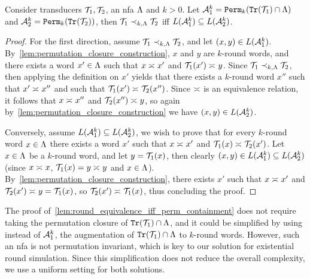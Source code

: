 \begin{lemma}
\label{lem:round_equivalence_iff_perm_containment}
	Consider transducers $\mathcal{T}_1,\mathcal{T}_2$, an \gls{nfa} $\Lambda$ and $k>0$. Let $\mathcal{A}_1^k={\mathtt{Perm}}_k({\mathtt{Tr}}(\mathcal{T}_1)\cap\Lambda)$ and $\mathcal{A}_2^k={\mathtt{Perm}}_k({\mathtt{Tr}}(\mathcal{T}_2))$,
	then $\mathcal{T}_1\prec_{k,\Lambda} \mathcal{T}_2$ iff $L(\mathcal{A}^k_1)\subseteq L(\mathcal{A}^k_2)$.
\end{lemma}
\begin{proof}
	For the first direction, assume $\mathcal{T}_1\prec_{k,\Lambda} \mathcal{T}_2$, and let $(x,y)\in L(\mathcal{A}^k_1)$. By~\cref{lem:permutation_closure_construction}, $x$ and $y$ are $k$-round words, and there exists a word $x'\in \Lambda$ such that $x\asymp_{} x'$ and $\mathcal{T}_1(x')\asymp_{} y$. Since $\mathcal{T}_1\prec_{k,\Lambda} \mathcal{T}_2$, then applying the definition on $x'$ yields that there exists a $k$-round word $x''$ such that $x'\asymp_{} x''$ and such that $\mathcal{T}_1(x')\asymp_{} \mathcal{T}_2(x'')$. Since $\asymp_{}$ is an equivalence relation, it follows that $x\asymp_{} x''$ and $\mathcal{T}_2(x'')\asymp_{} y$, so again by~\cref{lem:permutation_closure_construction} we have $(x,y)\in L(\mathcal{A}^k_2)$.
	
	Conversely, assume $L(\mathcal{A}^k_1)\subseteq L(\mathcal{A}^k_2)$, we wish to prove that for every $k$-round word $x\in \Lambda$ there exists a word $x'$ such that $x\asymp_{} x'$ and $\mathcal{T}_1(x)\asymp_{} \mathcal{T}_2(x')$. Let $x\in \Lambda$ be a $k$-round word, and let $y=\mathcal{T}_1(x)$, then clearly $(x,y)\in L(\mathcal{A}^k_1)\subseteq L(\mathcal{A}^k_2)$ (since $x\asymp_{} x$, $\mathcal{T}_1(x)=y\asymp_{} y$ and $x\in \Lambda$). By~\cref{lem:permutation_closure_construction}, there exists $x'$ such that $x\asymp_{} x'$ and $\mathcal{T}_2(x')\asymp_{} y=\mathcal{T}_1(x)$, so $\mathcal{T}_2(x')\asymp_{} \mathcal{T}_1(x)$, thus concluding the proof.
\end{proof}

\begin{remark}
\label{rmk:det_A1}
The proof of~\cref{lem:round_equivalence_iff_perm_containment} does not require taking the permutation closure of ${\mathtt{Tr}}(\mathcal{T}_1)\cap \Lambda$, and it could be simplified by using instead of $\mathcal{A}^k_1$, the augmentation of ${\mathtt{Tr}}(\mathcal{T}_1)\cap \Lambda$ to $k$-round words. However, such an \gls{nfa} is not permutation invariant, which is key to our solution for existential round simulation. Since this simplification does not reduce the overall complexity, we use a uniform setting for both solutions.
\end{remark}

